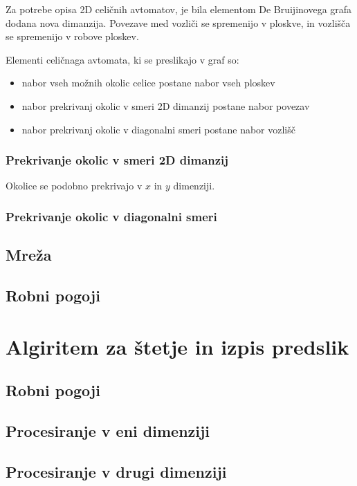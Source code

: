 \documentclass[12pt,a4paper,openany]{book}
\begin{document}
Za potrebe opisa 2D celičnih avtomatov, je bila elementom De Bruijinovega grafa dodana
nova dimanzija. Povezave med vozliči se spremenijo v ploskve, in vozlišča se spremenijo
v robove ploskev.

Elementi celičnaga avtomata, ki se preslikajo v graf so:
\begin{itemize}[noitemsep,nolistsep]
\item nabor vseh možnih okolic celice postane nabor vseh ploskev
\item nabor prekrivanj okolic v smeri 2D dimanzij postane nabor povezav
\item nabor prekrivanj okolic v diagonalni smeri postane nabor vozlišč
\end{itemize}

\subsection{Prekrivanje okolic v smeri 2D dimanzij}

Okolice se podobno prekrivajo v \(x\) in \(y\) dimenziji.

\subsection{Prekrivanje okolic v diagonalni smeri}

\section{Mreža}

\section{Robni pogoji} 


\chapter{Algiritem za štetje in izpis predslik}

\section{Robni pogoji}

\section{Procesiranje v eni dimenziji}

\section{Procesiranje v drugi dimenziji}
\end{document}
